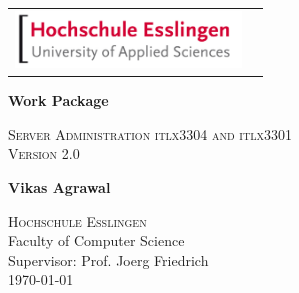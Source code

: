 
\begin{titlepage}

\begin{center}
\begin{table}              
\begin{tabular}{ll}
\includegraphics[width=6cm]{images/logo_hse.jpg} 
\end{tabular}
\end{table}
\end{center}

\begin{center}\huge
\vspace*{2mm}
\textbf{Work Package}\\

\vspace{17mm}

\textsc{Server Administration itlx3304 and itlx3301
} \\
\textsc{Version 2.0
}

\end{center}


\newpage

\vspace*{\fill}

\begin{center}

\vspace{17mm}

\singlespacing
\textbf{\huge{Vikas Agrawal}}

\vspace{5mm}

\large{\textsc{Hochschule Esslingen}}\\
\large{{Faculty of Computer Science}}\\

\vspace{5mm}
\large{Supervisor:  Prof. Joerg Friedrich}\\

\vspace{5mm}
\large{\today}\\

\vspace*{\fill}

\end{center}

\end{titlepage}
